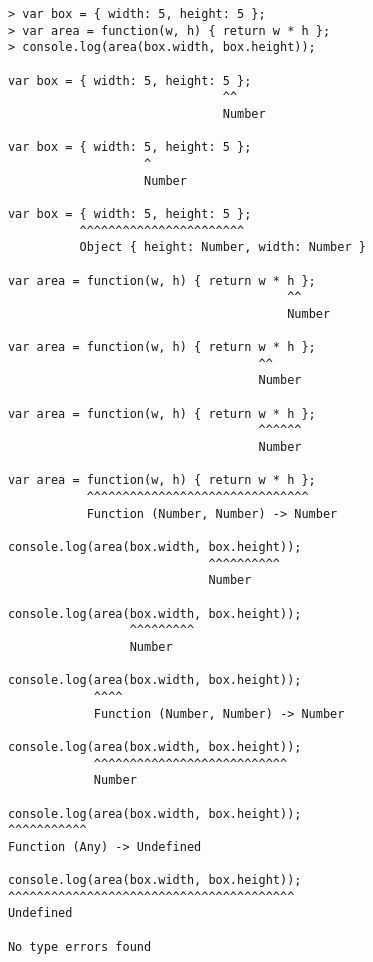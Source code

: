 \documentclass[british, twoside]{bhamthesis}
\theoremstyle{definition}
\begin{document}
      \begin{lstlisting}
      > var box = { width: 5, height: 5 };
      > var area = function(w, h) { return w * h };
      > console.log(area(box.width, box.height));

      var box = { width: 5, height: 5 };
                                    ^^
                                    Number

      var box = { width: 5, height: 5 };
                         ^
                         Number

      var box = { width: 5, height: 5 };
                ^^^^^^^^^^^^^^^^^^^^^^^
                Object { height: Number, width: Number }

      var area = function(w, h) { return w * h };
                                             ^^
                                             Number

      var area = function(w, h) { return w * h };
                                         ^^
                                         Number

      var area = function(w, h) { return w * h };
                                         ^^^^^^
                                         Number

      var area = function(w, h) { return w * h };
                 ^^^^^^^^^^^^^^^^^^^^^^^^^^^^^^^
                 Function (Number, Number) -> Number

      console.log(area(box.width, box.height));
                                  ^^^^^^^^^^
                                  Number

      console.log(area(box.width, box.height));
                       ^^^^^^^^^
                       Number

      console.log(area(box.width, box.height));
                  ^^^^
                  Function (Number, Number) -> Number

      console.log(area(box.width, box.height));
                  ^^^^^^^^^^^^^^^^^^^^^^^^^^^
                  Number

      console.log(area(box.width, box.height));
      ^^^^^^^^^^^
      Function (Any) -> Undefined

      console.log(area(box.width, box.height));
      ^^^^^^^^^^^^^^^^^^^^^^^^^^^^^^^^^^^^^^^^
      Undefined

      No type errors found
      \end{lstlisting}
\end{document}
